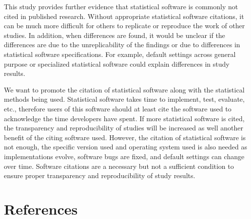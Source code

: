 \documentclass[english,,man]{apa6}
\begin{document}
This study provides further evidence that statistical software is commonly not cited in published research. Without appropriate statistical software citations, it can be much more difficult for others to replicate or reproduce the work of other studies. In addition, when differences are found, it would be unclear if the differences are due to the unreplicability of the findings or due to differences in statistical software specifications. For example, default settings across general purpose or specialized statistical software could explain differences in study results.

We want to promote the citation of statistical software along with the statistical methods being used. Statistical software takes time to implement, test, evaluate, etc., therefore users of this software should at least cite the software used to acknowledge the time developers have spent. If more statistical software is cited, the transparency and reproducibility of studies will be increased as well another benefit of the citing software used. However, the citation of statistical software is not enough, the specific version used and operating system used is also needed as implementations evolve, software bugs are fixed, and default settings can change over time. Software citations are a necessary but not a sufficient condition to ensure proper transparency and reproducibility of study results.

\newpage

\hypertarget{references}{%
\section{References}\label{references}}

\setlength{\parindent}{-0.5in}
\setlength{\leftskip}{0.5in}
\end{document}
